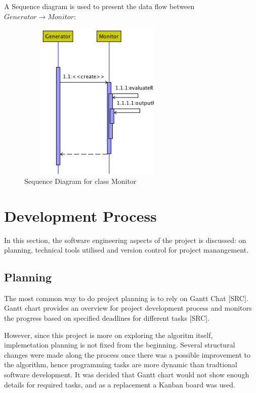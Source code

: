\begin{description}
A Sequence diagram is used to present the data flow between $Generator \rightarrow Monitor$:
\begin{figure}[h]
    \centering
    \includegraphics[width=3in, height=3in]{figures/sequence_monitor}
    \caption[Sequence Diagram for class Monitor]{Sequence Diagram for class Monitor}
    \label{fig:figure4_62}
\end{figure}

\end{description}

\section{Development Process}

In this section, the software engineering aspects of the project is discussed: on planning, technical tools utilised and version control for project manangement.

\subsection{Planning}

The most common way to do project planning is to rely on Gantt Chat [SRC]. Gantt chart provides an overview for project development process and monitors the progress based on specified deadlines for different tasks [SRC].

However, since this project is more on exploring the algoritm itself, implemetation planning is not fixed from the beginning. Several structural changes were made along the process once there was a possible improvement to the algorithm, hence programming tasks are more dynamic than tradtional software development. It was decided that Gantt chart would not show enough details for required tasks, and as a replacement a Kanban board was used.

